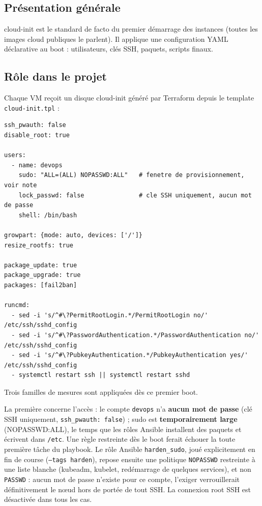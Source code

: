 \documentclass[12pt,a4paper,twoside,openright]{report}
\begin{document}
\subsection{Présentation générale}
cloud-init est le standard de facto du premier démarrage des instances (toutes les images cloud publiques le parlent). Il applique une configuration YAML déclarative au boot : utilisateurs, clés SSH, paquets, scripts finaux.

\subsection{Rôle dans le projet}
Chaque VM reçoit un disque cloud-init généré par Terraform depuis le template \texttt{cloud-init.tpl} :

\begin{lstlisting}[caption={Template cloud-init : durcissement appliqué avant toute autre étape}]
ssh_pwauth: false
disable_root: true

users:
  - name: devops
    sudo: "ALL=(ALL) NOPASSWD:ALL"   # fenetre de provisionnement, voir note
    lock_passwd: false               # cle SSH uniquement, aucun mot de passe
    shell: /bin/bash

growpart: {mode: auto, devices: ['/']}
resize_rootfs: true

package_update: true
package_upgrade: true
packages: [fail2ban]

runcmd:
  - sed -i 's/^#\?PermitRootLogin.*/PermitRootLogin no/' /etc/ssh/sshd_config
  - sed -i 's/^#\?PasswordAuthentication.*/PasswordAuthentication no/' /etc/ssh/sshd_config
  - sed -i 's/^#\?PubkeyAuthentication.*/PubkeyAuthentication yes/' /etc/ssh/sshd_config
  - systemctl restart ssh || systemctl restart sshd
\end{lstlisting}

Trois familles de mesures sont appliquées dès ce premier boot.

La première concerne l'accès : le compte \texttt{devops} n'a \textbf{aucun mot de passe} (clé SSH uniquement, \texttt{ssh\_pwauth: false}) ; sudo est \textbf{temporairement large} (NOPASSWD:ALL), le temps que les rôles Ansible installent des paquets et écrivent dans \texttt{/etc}. Une règle restreinte dès le boot ferait échouer la toute première tâche du playbook. Le rôle Ansible \texttt{harden\_sudo}, joué explicitement en fin de course (\texttt{--tags harden}), repose ensuite une politique \texttt{NOPASSWD} restreinte à une liste blanche (kubeadm, kubelet, redémarrage de quelques services), et non \texttt{PASSWD} : aucun mot de passe n'existe pour ce compte, l'exiger verrouillerait définitivement le nœud hors de portée de tout SSH. La connexion root SSH est désactivée dans tous les cas.
\end{document}

